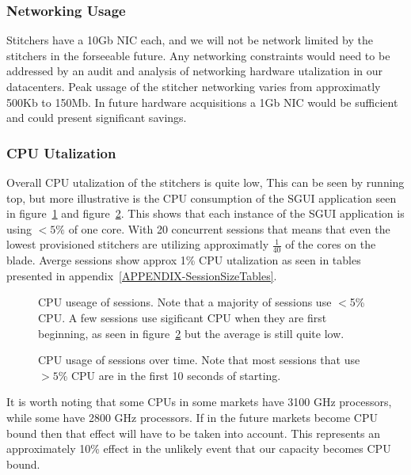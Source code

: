 \documentclass{article}
\begin{document}
\subsubsection{Networking Usage}
\label{SECTION-Networking}

Stitchers have a 10Gb NIC each, and we will not be network limited by the stitchers in the forseeable future. Any networking constraints would need to be addressed by an audit and analysis of networking hardware utalization in our datacenters. Peak ussage of the stitcher networking varies from approximatly 500Kb to 150Mb. In future hardware acquisitions a 1Gb NIC would be sufficient and could present significant savings. 

\subsubsection{CPU Utalization}
\label{SECTION-CPUUse}

Overall CPU utalization of the stitchers is quite low, This can be seen by running top, but more illustrative is the CPU consumption of the SGUI application seen in figure~\ref{FIGURE-CPUuse} and figure~\ref{FIGURE-CPUvsTime}. This shows that each instance of the SGUI application is using $<5\%$ of one core. With 20 concurrent sessions that means that even the lowest provisioned stitchers are utilizing approximatly $\frac{1}{40}$ of the cores on the blade. Averge sessions show approx 1\% CPU utalization as seen in tables presented in appendix~\ref{APPENDIX-SessionSizeTables}.

\begin{figure}[!htb]
        \caption{\label{FIGURE-CPUuse} CPU useage of sessions. Note that a majority of sessions use $<$5\% CPU.  A few sessions use sigificant CPU when they are first beginning, as seen in figure~\ref{FIGURE-CPUvsTime} but the average is still quite low.}
\end{figure}

\begin{figure}[!htb]
        \caption{\label{FIGURE-CPUvsTime} CPU usage of sessions over time. Note that most sessions that use $>5$\% CPU are in the first 10 seconds of starting.}
\end{figure}

It is worth noting that some CPUs in some markets have 3100 GHz processors, while some have 2800 GHz processors. If in the future markets become CPU bound then that effect will have to be taken into account. This represents an approximately 10\% effect in the unlikely event that our capacity becomes CPU bound. 
\end{document}
